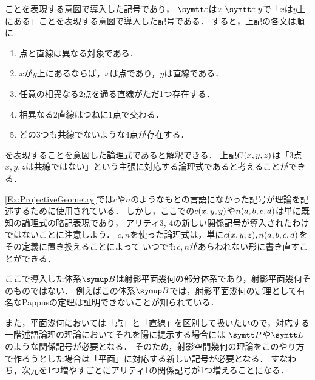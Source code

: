 \begin{Ex}
	ことを表現する意図で導入した記号であり，
	\(\LiesOn\)は\(x \LiesOn y\)で「\(x\)は\(y\)上にある」ことを表現する意図で導入した記号である．
	すると，上記の各文は順に
	\begin{enumerate}
		\item 点と直線は異なる対象である．
		\item \(x\)が\(y\)上にあるならば，\(x\)は点であり，\(y\)は直線である．
		\item 任意の相異なる2点を通る直線がただ1つ存在する．
		\item 相異なる2直線はつねに1点で交わる．
		\item どの3つも共線でないような4点が存在する．
	\end{enumerate}
	を表現することを意図した論理式であると解釈できる．
	上記\(\apply{C}{x, y, z}\)は「3点\(x, y, z\)は共線ではない」という主張に対応する論理式であると考えることができる．
\end{Ex}

\begin{Note}
	\cref{Ex:ProjectiveGeometry}では\(c\)や\(n\)のようなもとの言語になかった記号が理論を記述するために使用されている．
	しかし，ここでの\(\apply{c}{x, y, y}\)や\(\apply{n}{a, b, c, d}\)は単に既知の論理式の略記表現であり，
	アリティ3, 4の新しい関係記号が導入されたわけではないことに注意しよう．
	\(c, n\)を使った論理式は，単に\(\apply{c}{x, y, z}, \apply{n}{a, b, c, d}\)をその定義に置き換えることによって
	いつでも\(c, n\)があらわれない形に書き直すことができる．
\end{Note}

\begin{Note}
	ここで導入した体系\(\ProjectiveGeometryPart\)は射影平面幾何の部分体系であり，射影平面幾何そのものではない．
	例えばこの体系\(\ProjectiveGeometryPart\)では，射影平面幾何の定理として有名なPappusの定理は証明できないことが知られている．

	また，平面幾何においては「点」と「直線」を区別して扱いたいので，対応する一階述語論理の理論においてそれを陽に提示する場合には
	\(\obj{P}\)や\(\obj{L}\)のような関係記号が必要となる．
	そのため，射影空間幾何の理論をこのやり方で作ろうとした場合は「平面」に対応する新しい記号が必要となる．
	すなわち，次元を1つ増やすごとにアリティ1の関係記号が1つ増えることになる．
\end{Note}



